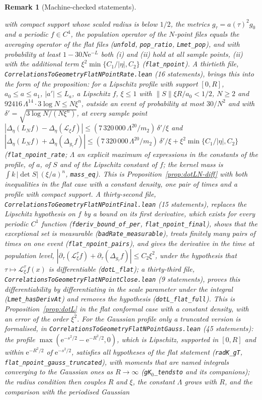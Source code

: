 \documentclass[11pt,a4paper]{article}
\theoremstyle{stmt}
\theoremstyle{defn}
\theoremstyle{rmk}
\newtheorem{remark}[theorem]{Remark}
\numberwithin{equation}{section}
\begin{document}
{\begin{remark}[Machine-checked statements]
\begin{itemize}
with compact support whose scaled radius is below $1/2$, the metrics $g_\tau=a(\tau)^2g_0$ and a periodic $f\in C^4$, the population operator of the $N$-point files equals the averaging operator of the flat files (\texttt{unfold}, \texttt{pop\_ratio}, \texttt{Lmet\_pop}), and with probability at least $1-30N\mathrm e^{-L}$ both (i) and (ii) hold at all sample points, (ii) with the additional term $\xi^2\min\{C_1/|\eta|,C_2\}$ (\texttt{flat\_npoint}). A thirtieth file, \texttt{CorrelationsToGeometryFlatNPointRate.lean} (16 statements), brings this into the form of the proposition: for a Lipschitz profile with support $[0,R]$, $a_0\le a\le a_1$, $|a'|\le L_a$, a Lipschitz $f$, $\xi\le1$ with $\|S\|\xi R/a_0<1/2$, $N\ge2$ and $92416\,\Lambda^{14}\cdot3\log N\le N\xi^n$, outside an event of probability at most $30/N^2$ and with $\delta'=\sqrt{3\log N/(N\xi^n)}$, at every sample point $|\Delta_\eta(L_Nf)-\Delta_\eta(\mathcal L_\xi f)|\le(7\,320\,000\,\Lambda^{20}/m_2)\,\delta'/\xi$ and $|\Delta_\eta(L_Nf)+\Delta_\eta(\Delta_{g_\tau}f)|\le(7\,320\,000\,\Lambda^{20}/m_2)\,\delta'/\xi+\xi^2\min\{C_1/|\eta|,C_2\}$ (\texttt{flat\_npoint\_rate}; $\Lambda$ an explicit maximum of expressions in the constants of the profile, of $a$, of $S$ and of the Lipschitz constant of $f$; the kernel mass is $\int k\,|\det S|\,(\xi/a)^n$, \texttt{mass\_eq}). This is Proposition~\ref{prop:dotLN-diff} with both inequalities in the flat case with a constant density, one pair of times and a profile with compact support. A thirty-second file, \texttt{CorrelationsToGeometryFlatNPointFinal.lean} (15 statements), replaces the Lipschitz hypothesis on $f$ by a bound on its first derivative, which exists for every periodic $C^1$ function (\texttt{fderiv\_bound\_of\_per}, \texttt{flat\_npoint\_final}), shows that the exceptional set is measurable (\texttt{badRate\_measurable}), treats finitely many pairs of times on one event (\texttt{flat\_npoint\_pairs}), and gives the derivative in the time at population level, $|\partial_\tau(\mathcal L^\tau_\xi f)+\partial_\tau(\Delta_{g_\tau}f)|\le C_2\xi^2$, under the hypothesis that $\tau\mapsto\mathcal L^\tau_\xi f(x)$ is differentiable (\texttt{dotL\_flat}); a thirty-third file, \texttt{CorrelationsToGeometryFlatNPointClose.lean} (9 statements), proves this differentiability by differentiating in the scale parameter under the integral (\texttt{Lmet\_hasDerivAt}) and removes the hypothesis (\texttt{dotL\_flat\_full}). This is Proposition~\ref{prop:dotL} in the flat conformal case with a constant density, with an error of the order $\xi^2$. For the Gaussian profile only a truncated version is formalised, in \texttt{CorrelationsToGeometryFlatNPointGauss.lean} (45 statements): the profile $\max(\mathrm e^{-s^2/2}-\mathrm e^{-R^2/2},0)$, which is Lipschitz, supported in $[0,R]$ and within $\mathrm e^{-R^2/2}$ of $\mathrm e^{-s^2/2}$, satisfies all hypotheses of the flat statement (\texttt{radK\_gT}, \texttt{flat\_npoint\_gauss\_truncated}), with moments that are named integrals converging to the Gaussian ones as $R\to\infty$ (\texttt{gK}$_0$\texttt{\_tendsto} and its companions); the radius condition then couples $R$ and $\xi$, the constant $\Lambda$ grows with $R$, and the comparison with the periodised Gaussian 
\end{itemize}
\end{remark}}
\end{document}
